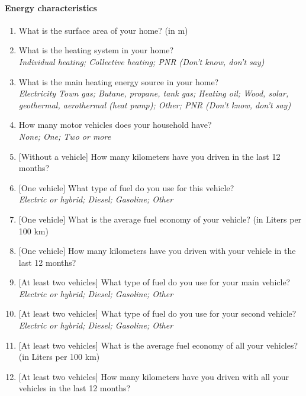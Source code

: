 \documentclass[12pt]{article} %
\begin{document}
\begin{appendices}
\paragraph{Energy characteristics}
\begin{enumerate}[resume,leftmargin=*]
\item What is the surface area of your home? (in m\texttwosuperior )
\item What is the heating system in your home? \emph{}\\
\emph{Individual heating; Collective heating; PNR (Don't know, don't
say)}
\item What is the main heating energy source in your home? \emph{}\\
\emph{Electricity Town gas; Butane, propane, tank gas; Heating oil;
Wood, solar, geothermal, aerothermal (heat pump); Other; PNR (Don't
know, don't say)}
\item How many motor vehicles does your household have? \emph{}\\
\emph{None; One; Two or more} 
\item {[}Without a vehicle{]} How many kilometers have you driven in the
last 12 months? 
\item {[}One vehicle{]} What type of fuel do you use for this vehicle? \emph{}\\
\emph{Electric or hybrid; Diesel; Gasoline; Other} 
\item {[}One vehicle{]} What is the average fuel economy of your vehicle?
(in Liters per 100 km)
\item {[}One vehicle{]} How many kilometers have you driven with your vehicle
in the last 12 months?
\item {[}At least two vehicles{]} What type of fuel do you use for your
main vehicle?\\
 \emph{Electric or hybrid; Diesel; Gasoline; Other} 
\item {[}At least two vehicles{]} What type of fuel do you use for your
second vehicle?\\
 \emph{Electric or hybrid; Diesel; Gasoline; Other} 
\item {[}At least two vehicles{]} What is the average fuel economy of all
your vehicles? (in Liters per 100 km) 
\item {[}At least two vehicles{]} How many kilometers have you driven with
all your vehicles in the last 12 months? 
\end{enumerate}


\end{appendices}
\end{document}

